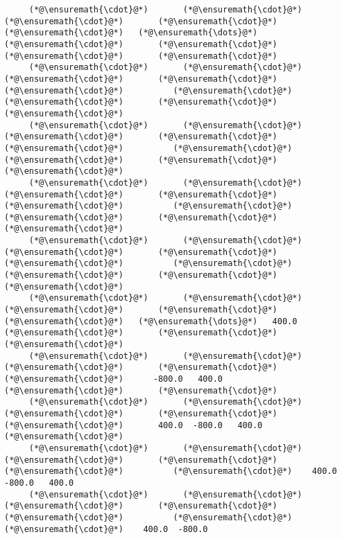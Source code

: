\documentclass[12pt,landscape]{article}
\begin{document}
{{\begin{lstlisting}
     (*@\ensuremath{\cdot}@*)       (*@\ensuremath{\cdot}@*)       (*@\ensuremath{\cdot}@*)       (*@\ensuremath{\cdot}@*)       (*@\ensuremath{\cdot}@*)   (*@\ensuremath{\dots}@*)      (*@\ensuremath{\cdot}@*)       (*@\ensuremath{\cdot}@*)       (*@\ensuremath{\cdot}@*)       (*@\ensuremath{\cdot}@*) 
     (*@\ensuremath{\cdot}@*)       (*@\ensuremath{\cdot}@*)       (*@\ensuremath{\cdot}@*)       (*@\ensuremath{\cdot}@*)       (*@\ensuremath{\cdot}@*)          (*@\ensuremath{\cdot}@*)       (*@\ensuremath{\cdot}@*)       (*@\ensuremath{\cdot}@*)       (*@\ensuremath{\cdot}@*) 
     (*@\ensuremath{\cdot}@*)       (*@\ensuremath{\cdot}@*)       (*@\ensuremath{\cdot}@*)       (*@\ensuremath{\cdot}@*)       (*@\ensuremath{\cdot}@*)          (*@\ensuremath{\cdot}@*)       (*@\ensuremath{\cdot}@*)       (*@\ensuremath{\cdot}@*)       (*@\ensuremath{\cdot}@*) 
     (*@\ensuremath{\cdot}@*)       (*@\ensuremath{\cdot}@*)       (*@\ensuremath{\cdot}@*)       (*@\ensuremath{\cdot}@*)       (*@\ensuremath{\cdot}@*)          (*@\ensuremath{\cdot}@*)       (*@\ensuremath{\cdot}@*)       (*@\ensuremath{\cdot}@*)       (*@\ensuremath{\cdot}@*) 
     (*@\ensuremath{\cdot}@*)       (*@\ensuremath{\cdot}@*)       (*@\ensuremath{\cdot}@*)       (*@\ensuremath{\cdot}@*)       (*@\ensuremath{\cdot}@*)          (*@\ensuremath{\cdot}@*)       (*@\ensuremath{\cdot}@*)       (*@\ensuremath{\cdot}@*)       (*@\ensuremath{\cdot}@*) 
     (*@\ensuremath{\cdot}@*)       (*@\ensuremath{\cdot}@*)       (*@\ensuremath{\cdot}@*)       (*@\ensuremath{\cdot}@*)       (*@\ensuremath{\cdot}@*)   (*@\ensuremath{\dots}@*)   400.0      (*@\ensuremath{\cdot}@*)       (*@\ensuremath{\cdot}@*)       (*@\ensuremath{\cdot}@*) 
     (*@\ensuremath{\cdot}@*)       (*@\ensuremath{\cdot}@*)       (*@\ensuremath{\cdot}@*)       (*@\ensuremath{\cdot}@*)       (*@\ensuremath{\cdot}@*)      -800.0   400.0      (*@\ensuremath{\cdot}@*)       (*@\ensuremath{\cdot}@*) 
     (*@\ensuremath{\cdot}@*)       (*@\ensuremath{\cdot}@*)       (*@\ensuremath{\cdot}@*)       (*@\ensuremath{\cdot}@*)       (*@\ensuremath{\cdot}@*)       400.0  -800.0   400.0      (*@\ensuremath{\cdot}@*) 
     (*@\ensuremath{\cdot}@*)       (*@\ensuremath{\cdot}@*)       (*@\ensuremath{\cdot}@*)       (*@\ensuremath{\cdot}@*)       (*@\ensuremath{\cdot}@*)          (*@\ensuremath{\cdot}@*)    400.0  -800.0   400.0
     (*@\ensuremath{\cdot}@*)       (*@\ensuremath{\cdot}@*)       (*@\ensuremath{\cdot}@*)       (*@\ensuremath{\cdot}@*)       (*@\ensuremath{\cdot}@*)          (*@\ensuremath{\cdot}@*)       (*@\ensuremath{\cdot}@*)    400.0  -800.0
\end{lstlisting}}
\newpage

}
\end{document}
